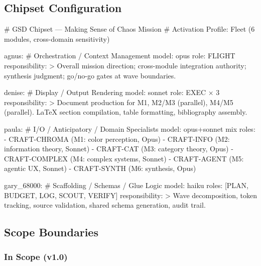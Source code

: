 \documentclass[11pt,letterpaper]{article}
\begin{document}
\subsection{Chipset Configuration}

\begin{asciibox}
# GSD Chipset — Making Sense of Chaos Mission
# Activation Profile: Fleet (6 modules, cross-domain sensitivity)

agnus:          # Orchestration / Context Management
  model: opus
  role: FLIGHT
  responsibility: >
    Overall mission direction; cross-module integration authority;
    synthesis judgment; go/no-go gates at wave boundaries.

denise:         # Display / Output Rendering
  model: sonnet
  role: EXEC × 3
  responsibility: >
    Document production for M1, M2/M3 (parallel), M4/M5 (parallel).
    LaTeX section compilation, table formatting, bibliography assembly.

paula:          # I/O / Anticipatory / Domain Specialists
  model: opus+sonnet mix
  roles:
    - CRAFT-CHROMA    (M1: color perception, Opus)
    - CRAFT-INFO      (M2: information theory, Sonnet)
    - CRAFT-CAT       (M3: category theory, Opus)
    - CRAFT-COMPLEX   (M4: complex systems, Sonnet)
    - CRAFT-AGENT     (M5: agentic UX, Sonnet)
    - CRAFT-SYNTH     (M6: synthesis, Opus)

gary_68000:     # Scaffolding / Schemas / Glue Logic
  model: haiku
  roles: [PLAN, BUDGET, LOG, SCOUT, VERIFY]
  responsibility: >
    Wave decomposition, token tracking, source validation,
    shared schema generation, audit trail.
\end{asciibox}

\subsection{Scope Boundaries}

\subsubsection{In Scope (v1.0)}
\end{document}
